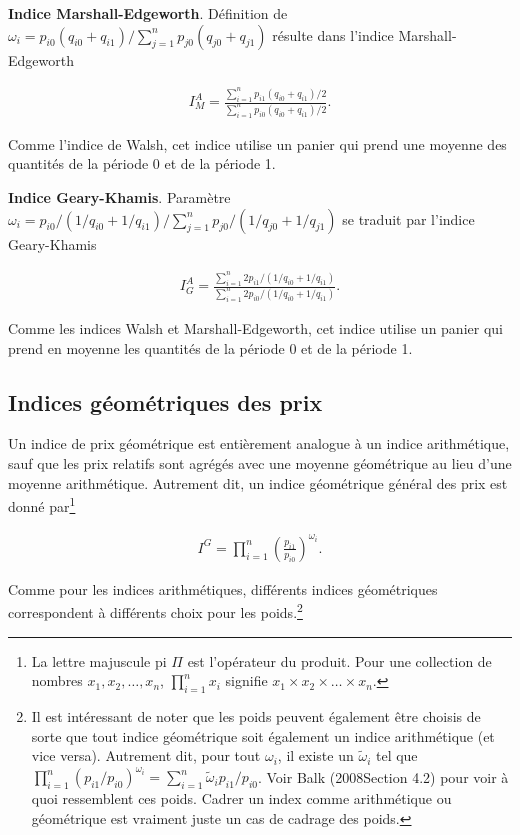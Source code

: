 \documentclass[
]{article}
\begin{document}
\textbf{Indice Marshall-Edgeworth}. Définition de \(\omega_{i} = p_{i0} (q_{i0} + q_{i1}) / \sum_{j = 1}^{n} p_{j0} (q_{j0} + q_{j1})\) résulte dans l'indice Marshall-Edgeworth

\begin{align*}
I^{A}_{M} = \frac{\sum_{i = 1}^{n} p_{i1} (q_{i0} + q_{i1}) / 2}{\sum_{i = 1}^{n} p_{i0} (q_{i0} + q_{i1}) / 2}.
\end{align*}

Comme l'indice de Walsh, cet indice utilise un panier qui prend une moyenne des quantités de la période 0 et de la période 1.

\textbf{Indice Geary-Khamis}. Paramètre \(\omega_{i} = p_{i0} / (1 / q_{i0} + 1 / q_{i1}) / \sum_{j = 1}^{n} p_{j0} / (1 / q_{j0} + 1 / q_{j1})\) se traduit par l'indice Geary-Khamis

\begin{align*}
I^{A}_{G} = \frac{\sum_{i = 1}^{n} 2 p_{i1} / (1 / q_{i0} + 1 / q_{i1})}{\sum_{i = 1}^{n} 2 p_{i0} / (1 / q_{i0} + 1 / q_{i1})}.
\end{align*}

Comme les indices Walsh et Marshall-Edgeworth, cet indice utilise un panier qui prend en moyenne les quantités de la période 0 et de la période 1.

\hypertarget{indices-guxe9omuxe9triques-des-prix}{%
\subsection{Indices géométriques des prix}\label{indices-guxe9omuxe9triques-des-prix}}

Un indice de prix géométrique est entièrement analogue à un indice arithmétique, sauf que les prix relatifs sont agrégés avec une moyenne géométrique au lieu d'une moyenne arithmétique. Autrement dit, un indice géométrique général des prix est donné par\footnote{La lettre majuscule pi \(\Pi\) est l'opérateur du produit. Pour une collection de nombres \(x_{1}, x_{2}, \ldots, x_{n}\), \(\prod_{i = 1}^{n} x_{i}\) signifie \(x_{1} \times x_{2} \times \ldots \times x_{n}\).}

\begin{align*}
I^{G} = \prod_{i = 1}^{n} \left(\frac{p_{i1}}{p_{i0}} \right)^{\omega_{i}}.
\end{align*}

Comme pour les indices arithmétiques, différents indices géométriques correspondent à différents choix pour les poids.\footnote{Il est intéressant de noter que les poids peuvent également être choisis de sorte que tout indice géométrique soit également un indice arithmétique (et vice versa). Autrement dit, pour tout \(\omega_{i}\), il existe un \(\tilde{\omega}_{i}\) tel que \(\prod_{i = 1}^{n} (p_{i1} / p_{i0})^{\omega_{i}} = \sum_{i = 1}^{n} \tilde{\omega}_{i} p_{i1} / p_{i0}\). Voir Balk (2008Section 4.2) pour voir à quoi ressemblent ces poids. Cadrer un index comme arithmétique ou géométrique est vraiment juste un cas de cadrage des poids.}
\end{document}
